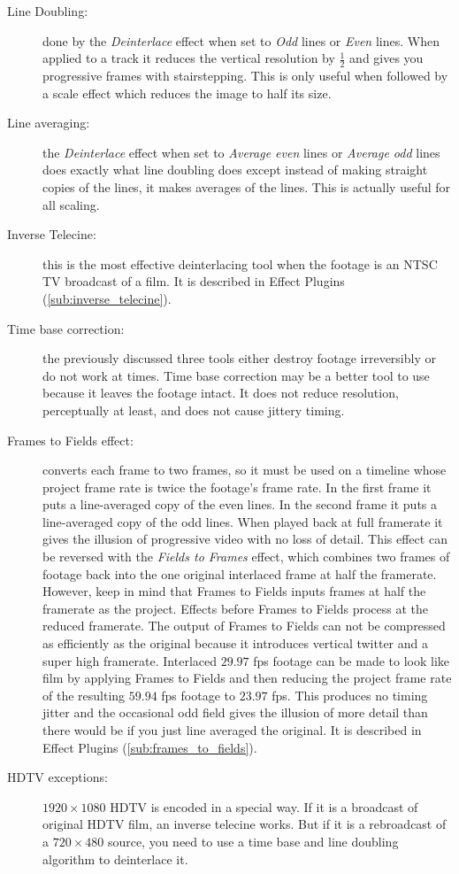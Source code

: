 \begin{description}
	\item[Line Doubling:] done by the \textit{Deinterlace} effect when set to \textit{Odd} lines or \textit{Even} lines.  When applied to a track it reduces the vertical resolution by $\frac{1}{2}$ and gives you progressive frames with stairstepping. This is only useful when followed by a scale effect which reduces the image to half its size.
	\item[Line averaging:] the \textit{Deinterlace} effect when set to \textit{Average even} lines or \textit{Average odd} lines does exactly what line doubling does except instead of making straight copies of the lines, it makes averages of the lines. This is actually useful for all scaling.
	\item[Inverse Telecine:] this is the most effective deinterlacing tool when the footage is an NTSC TV broadcast of a film. It is described in Effect Plugins (\ref{sub:inverse_telecine}).
	\item[Time base correction:] the previously discussed three tools either destroy footage irreversibly or do not work at times. Time base correction may be a better tool to use because it leaves the footage intact. It does not reduce resolution, perceptually at least, and does not cause jittery timing.
	\item[Frames to Fields effect:] converts each frame to two frames, so it must be used on a timeline whose project frame rate is twice the footage's frame rate. In the first frame it puts a line-averaged copy of the even lines. In the second frame it puts a line-averaged copy of the odd lines. When played back at full framerate it gives the illusion of progressive video with no loss of detail. This effect can be reversed with the \textit{Fields to Frames} effect, which combines two frames of footage back into the one original interlaced frame at half the framerate. However, keep in mind that Frames to Fields inputs frames at half the framerate as the project. Effects before Frames to Fields process at the reduced framerate.  The output of Frames to Fields can not be compressed as efficiently as the original because it introduces vertical twitter and a super high framerate. Interlaced $29.97$ fps footage can be made to look like film by applying Frames to Fields and then reducing the project frame rate of the resulting $59.94$ fps footage to $23.97$ fps. This produces no timing jitter and the occasional odd field gives the illusion of more detail than there would be if you just line averaged the original. It is described in Effect Plugins (\ref{sub:frames_to_fields}).
	\item[HDTV exceptions:] $1920\times1080$ HDTV is encoded in a special way. If it is a broadcast of original HDTV film, an inverse telecine works.  But if it is a rebroadcast of a $720\times480$ source, you need to use a time base and line doubling algorithm to deinterlace it.
\end{description}

